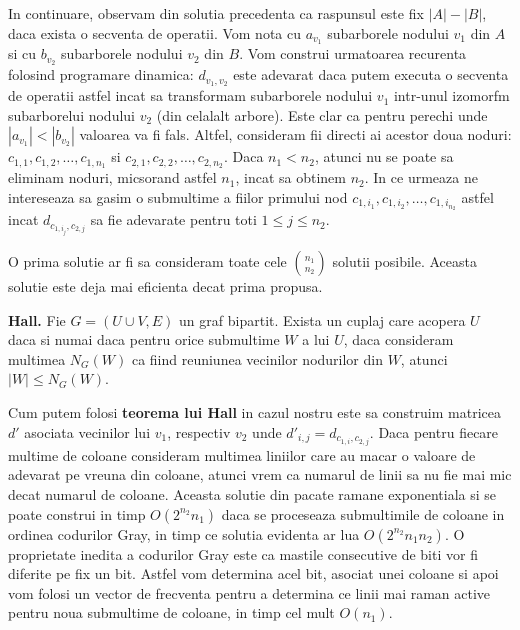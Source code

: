 In continuare, observam din solutia precedenta ca raspunsul este fix $|A| - |B|$, daca exista o secventa de operatii. Vom nota cu $a_{v_{1}}$
subarborele nodului $v_{1}$ din $A$ si cu $b_{v_{2}}$ subarborele nodului $v_{2}$ din $B$. Vom construi urmatoarea recurenta folosind
programare dinamica: $d_{v_{1}, v_{2}}$ este adevarat daca putem executa o secventa de operatii astfel incat sa transformam subarborele
nodului $v_{1}$ intr-unul izomorfm subarborelui nodului $v_{2}$ (din celalalt arbore). Este clar ca pentru perechi unde $|a_{v_{1}}| < |b_{v_{2}}|$ valoarea va fi fals. Altfel, consideram fii directi ai acestor doua noduri: $c_{1, 1}, c_{1, 2}, \ldots, c_{1, n_{1}}$ si $c_{2, 1}, c_{2, 2}, \ldots, c_{2, n_{2}}$.
Daca $n_{1} < n_{2}$, atunci nu se poate sa eliminam noduri, micsorand astfel $n_{1}$, incat sa obtinem $n_{2}$. In ce urmeaza ne intereseaza sa gasim o
submultime a fiilor primului nod $c_{1, i_{1}}, c_{1, i_{2}}, \ldots, c_{1, i_{n_{2}}}$ astfel incat $d_{c_{1, i_{j}}, c_{2, j}}$ sa fie adevarate
pentru toti $1 \leq j \leq n_{2}$.

O prima solutie ar fi sa consideram toate cele $\binom{n_{1}}{n_{2}}$ solutii posibile. Aceasta solutie este deja mai eficienta decat prima propusa.

\begin{thm}
  \label{hall}
  \textbf{Hall.} Fie $G = (U \cup V, E)$ un graf bipartit. Exista un cuplaj care acopera $U$ daca si numai daca pentru orice submultime $W$
  a lui $U$, daca consideram multimea $N_{G}(W)$ ca fiind reuniunea vecinilor nodurilor din $W$, atunci $|W| \leq N_{G}(W)$.
\end{thm}

Cum putem folosi \textbf{teorema lui Hall} in cazul nostru este sa construim matricea $d'$ asociata vecinilor lui $v_{1}$, respectiv $v_{2}$
unde $d'_{i, j} = d_{c_{1, i}, c_{2, j}}$. Daca pentru fiecare multime de coloane consideram multimea liniilor care au macar o valoare de adevarat
pe vreuna din coloane, atunci vrem ca numarul de linii sa nu fie mai mic decat numarul de coloane. Aceasta solutie din pacate ramane exponentiala
si se poate construi in timp $O(2^{n_{2}} n_{1})$ daca se proceseaza submultimile de coloane in ordinea codurilor Gray, in timp ce solutia evidenta ar lua
$O(2^{n_{2}} n_{1}n_{2})$. O proprietate inedita a codurilor Gray este ca mastile consecutive de biti vor fi diferite pe fix un bit. Astfel vom determina acel bit,
asociat unei coloane si apoi vom folosi un vector de frecventa pentru a determina ce linii mai raman active pentru noua submultime de coloane, in timp
cel mult $O(n_{1})$.


